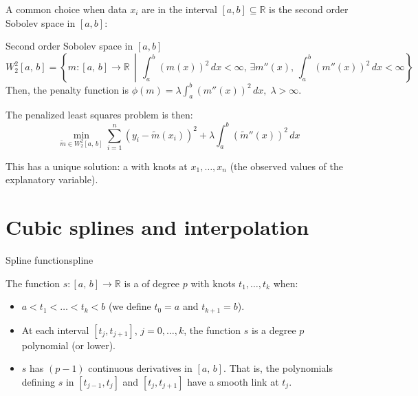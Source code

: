 A common choice when data $x_i$ are in the interval $[a,b] \subseteq \mathbb{R}$ is
the second order Sobolev space in $[a,b]$:
\begin{definition}{Second order Sobolev space}{} in $[a, b]$
    \begin{equation*}
        W_2^2[a,\,b] = \left\{
            m : [a,\,b] \to \mathbb{R} \,\middle|\,
            \int_a^b \left(m(x)\right)^2 \,dx < \infty,\,
            \exists m''(x),\,
            \int_a^b \left(m''(x)\right)^2 \,dx < \infty
            \right\}
    \end{equation*}
    \tcbline
    Then, the penalty function is $\phi(m) = \lambda \int_a^b \left(m''(x)\right)^2 \,dx,\;\lambda > \infty$.

    The penalized least squares problem is then:
    \begin{equation*}
        \min_{\tilde m \in W_2^2[a,\,b]}
        \sum_{i=1}^n \left(y_i - \tilde m(x_i)\right)^2
        + \lambda \int_a^b \left(\tilde m''(x)\right)^2 \,dx
    \end{equation*}

    This has a unique solution: a  with knots at $x_1,\ldots,x_n$
    (the observed values of the explanatory variable).
\end{definition}


\section{Cubic splines and interpolation}

\begin{definition}{Spline function}{spline}

    The function $s : [a,\,b] \to \mathbb{R}$ is a  of
    degree $p$ with knots $t_1, \ldots, t_k$ when:
    \begin{itemize}
        \item $a < t_1 < \ldots < t_k < b$ (we define $t_0 = a$ and $t_{k+1} = b$).
        \item At each interval $[t_j, t_{j+1}]$, $j=0,\ldots,k$, the function $s$ is
            a degree $p$ polynomial (or lower).
        \item $s$ has $(p-1)$ continuous derivatives in $[a,\,b]$. That is,
            the polynomials defining $s$ in $[t_{j-1}, t_{j}]$ and $[t_j, t_{j+1}]$
            have a smooth link at $t_j$.
    \end{itemize}
\end{definition}

